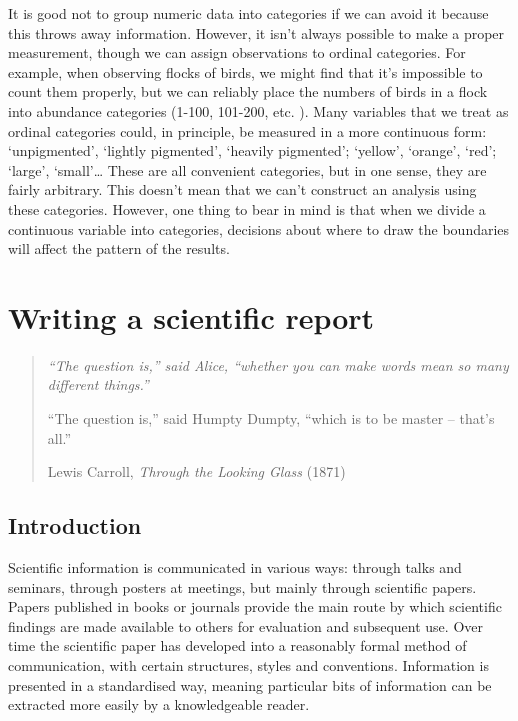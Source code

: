 \documentclass[
]{book}
\begin{document}
It is good not to group numeric data into categories if we can avoid it because this throws away information. However, it isn't always possible to make a proper measurement, though we can assign observations to ordinal categories. For example, when observing flocks of birds, we might find that it's impossible to count them properly, but we can reliably place the numbers of birds in a flock into abundance categories (1-100, 101-200, etc. ). Many variables that we treat as ordinal categories could, in principle, be measured in a more continuous form: `unpigmented', `lightly pigmented', `heavily pigmented'; `yellow', `orange', `red'; `large', `small'\ldots{} These are all convenient categories, but in one sense, they are fairly arbitrary. This doesn't mean that we can't construct an analysis using these categories. However, one thing to bear in mind is that when we divide a continuous variable into categories, decisions about where to draw the boundaries will affect the pattern of the results.

\hypertarget{writing-a-scientific-report}{%
\chapter{Writing a scientific report}\label{writing-a-scientific-report}}

\begin{quote}
\emph{``The question is,'' said Alice, ``whether you can make words mean so many different things.''}

``The question is,'' said Humpty Dumpty, ``which is to be master -- that's all.''

Lewis Carroll, \emph{Through the Looking Glass} (1871)
\end{quote}

\hypertarget{introduction-5}{%
\section{Introduction}\label{introduction-5}}

Scientific information is communicated in various ways: through talks and seminars, through posters at meetings, but mainly through scientific papers. Papers published in books or journals provide the main route by which scientific findings are made available to others for evaluation and subsequent use. Over time the scientific paper has developed into a reasonably formal method of communication, with certain structures, styles and conventions. Information is presented in a standardised way, meaning particular bits of information can be extracted more easily by a knowledgeable reader.
\end{document}
